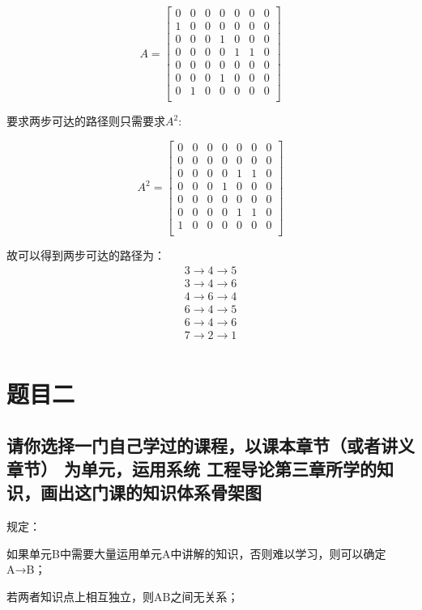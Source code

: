 \documentclass[UTF8]{ctexart}
\begin{document}
$$
A=\left[\begin{matrix}0&0&0&0&0&0&0\\1&0&0&0&0&0&0\\0&0&0&1&0&0&0\\0&0&0&0&1&1&0\\0&0&0&0&0&0&0\\0&0&0&1&0&0&0\\0&1&0&0&0&0&0\\\end{matrix}\right]
$$

要求两步可达的路径则只需要求$A^2$:

$$
A^2=\left[\begin{matrix}0&0&0&0&0&0&0\\0&0&0&0&0&0&0\\0&0&0&0&1&1&0\\0&0&0&1&0&0&0\\0&0&0&0&0&0&0\\0&0&0&0&1&1&0\\1&0&0&0&0&0&0\\\end{matrix}\right]
$$

故可以得到两步可达的路径为：
$$
\begin{array}{c}
3\rightarrow 4\rightarrow 5\\
3\rightarrow 4\rightarrow 6\\
4\rightarrow 6\rightarrow 4\\
6\rightarrow 4\rightarrow 5\\
6\rightarrow 4\rightarrow 6\\
7\rightarrow 2\rightarrow 1\\
\end{array}
$$


\section{题目二}

\subsection{请你选择一门自己学过的课程，以课本章节（或者讲义章节） 为单元，运用系统
工程导论第三章所学的知识，画出这门课的知识体系骨架图}

\noindent 规定：

如果单元B中需要大量运用单元A中讲解的知识，否则难以学习，则可以确定A→B；

若两者知识点上相互独立，则AB之间无关系；
\end{document}
